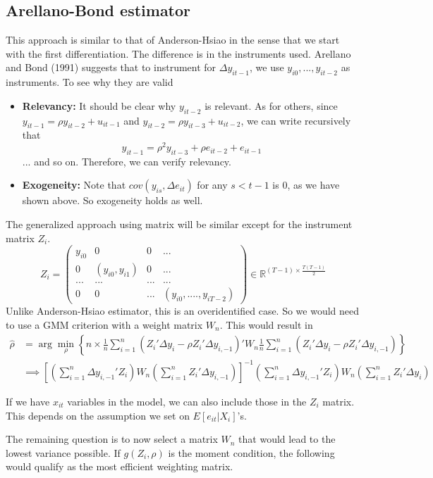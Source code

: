 \documentclass[12pt]{article}
\theoremstyle{definition}
\theoremstyle{property}
\theoremstyle{assumption}
\theoremstyle{example}
\theoremstyle{comment}
\begin{document}
\subsection{Arellano-Bond estimator}
This approach is similar to that of Anderson-Hsiao in the sense that we start with the first differentiation. The difference is in the instruments used. Arellano and Bond (1991) suggests that to instrument for $\Delta y_{it-1}$, we use $y_{i0},...,y_{it-2}$ as instruments. To see why they are valid
\begin{itemize}
\item \textbf{Relevancy:} It should be clear why $y_{it-2}$ is relevant. As for others, since $y_{it-1}=\rho y_{it-2}+u_{it-1}$ and $y_{it-2}=\rho y_{it-3}+u_{it-2}$, we can write recursively that
\[
y_{it-1} = \rho^2 y_{it-3}+\rho e_{it-2} + e_{it-1}
\]
... and so on. Therefore, we can verify relevancy.
\item \textbf{Exogeneity:} Note that $cov(y_{is},\Delta e_{it})$ for any $s<t-1$ is 0, as we have shown above. So exogeneity holds as well. 
\end{itemize}
The generalized approach using matrix will be similar except for the instrument matrix $Z_i$.
\[
Z_i = \begin{pmatrix}y_{i0}& 0 & 0 & ... \\ 0 & (y_{i0},y_{i1})& 0 & ... \\ ... & ... &...&...\\ 0 & 0 & ... & (y_{i0},....,y_{iT-2}) \end{pmatrix}\in\mathbb{R}^{(T-1)\times \frac{T(T-1)}{2}}
\]
Unlike Anderson-Hsiao estimator, this is an overidentified case. So we would need to use a GMM criterion with a weight matrix $W_n$. This would result in
\begin{align*}
\hat{\rho}&=\arg\min_\rho \left\{n\times \frac{1}{n}\sum_{i=1}^n(Z_i'\Delta {y}_i - \rho Z_i'\Delta {y}_{i,-1})'W_n  \frac{1}{n}\sum_{i=1}^n(Z_i'\Delta {y}_i - \rho Z_i'\Delta {y}_{i,-1})\right\}\\
&\implies \left[\left(\sum_{i=1}^n\Delta {y}_{i,-1}' Z_i\right)W_n\left(\sum_{i=1}^n Z_i' \Delta {y}_{i,-1}\right) \right]^{-1}\left(\sum_{i=1}^n\Delta {y}_{i,-1}' Z_i\right)W_n\left(\sum_{i=1}^n Z_i' \Delta {y}_i \right)
\end{align*}
\par
If we have $x_{it}$ variables in the model, we can also include those in the $Z_i$ matrix. This depends on the assumption we set on $E[e_{it}|X_i]$'s.
\par
The remaining question is to now select a matrix $W_n$ that would lead to the lowest variance possible. If $g(Z_i,\rho)$ is the moment condition, the following would qualify as the most efficient weighting matrix.
\end{document}

